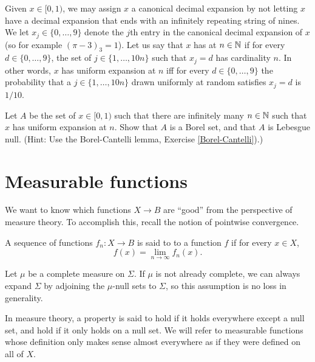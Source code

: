 \begin{exercise}
Given $x \in [0, 1)$, we may assign $x$ a canonical decimal expansion by not letting $x$ have a decimal expansion that ends with an infinitely repeating string of nines.
We let $x_{j} \in \{0, \dots, 9\}$ denote the $j$th entry in the canonical decimal expansion of $x$ (so for example $(\pi - 3)_3 = 1$).
Let us say that $x$ has  at $n \in \mathbb{N}$ if for every $d \in \{0, \dots, 9\}$, the set of $j \in \{1, \dots, 10n\}$ such that $x_{j} = d$ has cardinality $n$.
In other words, $x$ has uniform expansion at $n$ iff for every $d \in \{0, \dots, 9\}$ the probability that a $j \in \{1, \dots, 10n\}$ drawn uniformly at random satisfies $x_{j} = d$ is $1/10$.

Let $A$ be the set of $x \in [0, 1)$ such that there are infinitely many $n \in \mathbb{N}$ such that $x$ has uniform expansion at $n$.
Show that $A$ is a Borel set, and that $A$ is Lebesgue null. (Hint: Use the Borel-Cantelli lemma, Exercise \ref{Borel-Cantelli}).)
\end{exercise}



\section{Measurable functions}
We want to know which functions $X \to B$ are ``good'' from the perspective of measure theory. To accomplish this, recall the notion of pointwise convergence.

\begin{definition}
A sequence of functions $f_{n}: X \to B$ is said to  to a function $f$ if for every $x \in X$,
\[f(x) = \lim_{n \to \infty} f_{n}(x).\]
\end{definition}

\begin{subsec}
Let $\mu$ be a complete measure on $\Sigma$.
If $\mu$ is not already complete, we can always expand $\Sigma$ by adjoining the $\mu$-null sets to $\Sigma$, so this assumption is no loss in generality.
\end{subsec}

\begin{subsec}
In measure theory, a property is said to hold  if it holds everywhere except a null set, and hold  if it only holds on a null set.
We will refer to measurable functions whose definition only makes sense almost everywhere as if they were defined on all of $X$.
\end{subsec}

